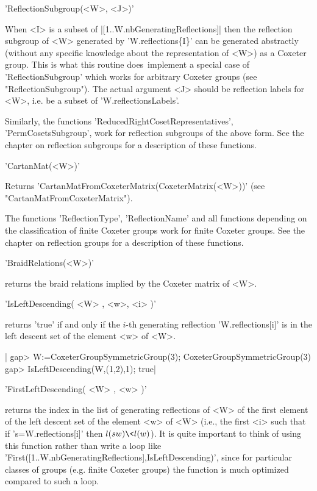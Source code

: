 'ReflectionSubgroup(<W>, <J>)'

When  <I>  is  a  subset of  |[1..W.nbGeneratingReflections]|  then  the
reflection  subgroup  of  <W>   generated  by  'W.reflections\{I\}'  can
be  generated  abstractly  (without  any specific  knowledge  about  the
representation of  <W>) as a  Coxeter group.  This is what  this routine
does\:\  implement a  special case  of 'ReflectionSubgroup'  which works
for  arbitrary Coxeter  groups  (see  "ReflectionSubgroup"). The  actual
argument <J>  should be reflection labels  for <W>, i.e. be  a subset of
'W.reflectionsLabels'.

Similarly,     the     functions     'ReducedRightCosetRepresentatives',
'PermCosetsSubgroup', work  for reflection subgroups of  the above form.
See  the chapter  on reflection  subgroups  for a  description of  these
functions.

'CartanMat(<W>)'

Returns       'CartanMatFromCoxeterMatrix(CoxeterMatrix(<W>))'      (see
"CartanMatFromCoxeterMatrix").

The  functions  'ReflectionType',  'ReflectionName'  and  all  functions
depending on the classification of finite Coxeter groups work for finite
Coxeter groups. See  the chapter on reflection groups  for a description
of these functions.

'BraidRelations(<W>)'

returns the braid relations implied by the Coxeter matrix of <W>.


'IsLeftDescending( <W> , <w>, <i> )'

returns  'true'  if  and  only   if  the  $i$-th  generating  reflection
'W.reflections[i]' is in the left descent set of the element <w> of <W>.

|    gap> W:=CoxeterGroupSymmetricGroup(3);
    CoxeterGroupSymmetricGroup(3)
    gap> IsLeftDescending(W,(1,2),1);
    true|



'FirstLeftDescending( <W> , <w> )'

returns the  index in the list  of generating reflections of  <W> of the
first element of the  left descent set of the element  <w> of <W> (i.e.,
the first <i> such that  if 's=W.reflections[i]' then $l(sw)\<l(w)$). It
is quite  important to think  of using  this function rather  than write
a  loop  like  'First([1..W.nbGeneratingReflections],IsLeftDescending)',
since for particular classes of  groups (e.g. finite Coxeter groups) the
function is much optimized compared to such a loop.

